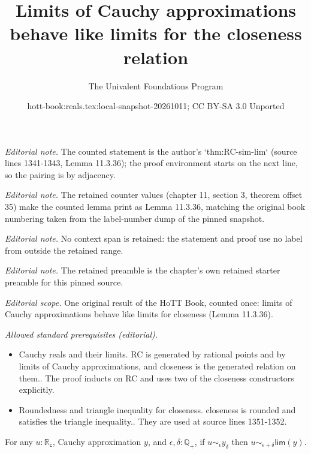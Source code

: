 \documentclass[10pt,a4paper]{article}
\title{Limits of Cauchy approximations behave like limits for the closeness relation}
\author{The Univalent Foundations Program}
\date{hott-book:reals.tex:local-snapshot-20261011; CC BY-SA 3.0 Unported}
\newcounter{chapter}
\newcommand{\Q}{\ensuremath{\mathbb{Q}}\xspace}
\newcommand{\RC}{\ensuremath{\mathbb{R}_\mathsf{c}}\xspace} %
\newcommand{\close}[1]{\sim_{#1}} %
\newcommand{\rclim}{\mathsf{lim}} %
\newcommand{\Qp}{\Q_{+}}
\theoremstyle{definition}
\theoremstyle{remark}
\numberwithin{equation}{section}
\begin{document}
\maketitle
\setcounter{chapter}{11}
\setcounter{section}{3}
\setcounter{thm}{35}
\noindent\textit{Editorial note.} The counted statement is the author's `thm:RC-sim-lim` (source lines 1341-1343, Lemma 11.3.36); the proof environment starts on the next line, so the pairing is by adjacency.\par\medskip
\noindent\textit{Editorial note.} The retained counter values (chapter 11, section 3, theorem offset 35) make the counted lemma print as Lemma 11.3.36, matching the original book numbering taken from the label-number dump of the pinned snapshot.\par\medskip
\noindent\textit{Editorial note.} No context span is retained: the statement and proof use no label from outside the retained range.\par\medskip
\noindent\textit{Editorial note.} The retained preamble is the chapter's own retained starter preamble for this pinned source.\par\medskip
\noindent\textit{Editorial scope.} One original result of the HoTT Book, counted once: limits of Cauchy approximations behave like limits for closeness (Lemma 11.3.36).\par\medskip
\noindent\textit{Allowed standard prerequisites (editorial).}\begin{itemize}
\item Cauchy reals and their limits. RC is generated by rational points and by limits of Cauchy approximations, and closeness is the generated relation on them.. The proof inducts on RC and uses two of the closeness constructors explicitly.
\item Roundedness and triangle inequality for closeness. closeness is rounded and satisfies the triangle inequality.. They are used at source lines 1351-1352.
\end{itemize}\medskip
\begin{lem}\label{thm:RC-sim-lim}
  For any $u:\RC$, Cauchy approximation $y$, and $\epsilon,\delta:\Qp$, if $u\close\epsilon y_\delta$ then $u\close{\epsilon+\delta} \rclim(y)$.
\end{lem}
\end{document}
